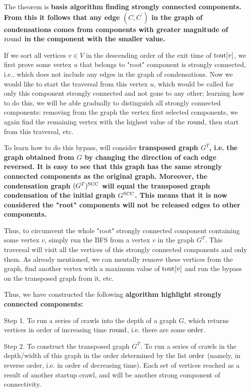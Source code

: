 The theorem is \bf{basis algorithm} finding strongly connected components. From this it follows that any edge $(C,C^\prime)$ in the graph of condensations comes from components with greater magnitude of ${\rm round}$ in the component with the smaller value.

If we sort all vertices $v \in V$ in the descending order of the exit time of ${\rm tout}[v]$, we first prove some vertex $u$ that belongs to "root" component is strongly connected, i.e., which does not include any edges in the graph of condensations. Now we would like to start the traversal from this vertex $u$, which would be called for only this component strongly connected and not gone to any other; learning how to do this, we will be able gradually to distinguish all strongly connected components: removing from the graph the vertex first selected components, we again find the remaining vertex with the highest value of the ${\rm round}$, then start from this traversal, etc.

To learn how to do this bypass, will consider \bf{transposed graph} $G^T$, i.e. the graph obtained from $G$ by changing the direction of each edge reversed. It is easy to see that this graph has the same strongly connected components as the original graph. Moreover, the condensation graph $(G^T)^{\rm SCC}$ will equal the transposed graph condensation of the initial graph $G^{\rm SCC}$. This means that it is now considered the "root" components will not be released edges to other components.

Thus, to circumvent the whole "root" strongly connected component containing some vertex $v$, simply run the BFS from a vertex $v$ in the graph $G^T$. This traversal will visit all the vertices of this strongly connected components and only them. As already mentioned, we can mentally remove these vertices from the graph, find another vertex with a maximum value of ${\rm tout}[v]$ and run the bypass on the transposed graph from it, etc.

Thus, we have constructed the following \bf{algorithm} highlight strongly connected components:

Step 1. To run a series of crawls into the depth of a graph $G$, which returns vertices in order of increasing time ${\rm round}$, i.e. there are some $\rm order$.

Step 2. To construct the transposed graph $G^T$. To run a series of crawls in the depth/width of this graph in the order determined by the list $\rm order$ (namely, in reverse order, i.e. in order of decreasing time). Each set of vertices reached as a result of another startup crawl, and will be another strong component of connectivity.


